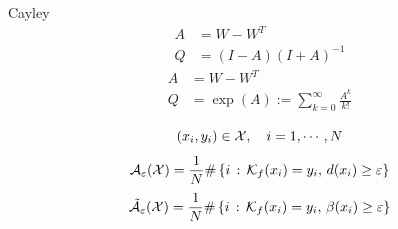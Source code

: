 \documentclass[aspectratio=169, 9pt]{beamer}
\theoremstyle{definition}
\begin{document}
\begin{frame}{Cayley}
  \[
  \begin{aligned}
    A &= W-W^T\\
    Q &= (I-A)(I+A)^{-1}
  \end{aligned}
  \]
  \[
  \begin{aligned}
    A &= W-W^T\\
    Q &= \exp(A):=\sum_{k=0}^\infty \frac{A^k}{k!}
  \end{aligned}
  \]
\end{frame}
\begin{frame}
  \[
    (x_i,y_i) \in\mathcal{X}, \quad i=1,\cdots,N
  \]
  \[
    \mathcal{A}_\varepsilon(\mathcal{X}) = \frac1N \#\left\{ i\,:\, \mathcal{K}_f(x_i)=y_i,\, d(x_i)\ge
    \varepsilon\right\}
  \]
  \[
      \tilde{\mathcal{A}}_\varepsilon(\mathcal{X}) = \frac1N \#\left\{ i\,:\, \mathcal{K}_f(x_i)=y_i,\,
        \beta(x_i)\ge
    \varepsilon\right\}
  \]
\end{frame}
\end{document}
